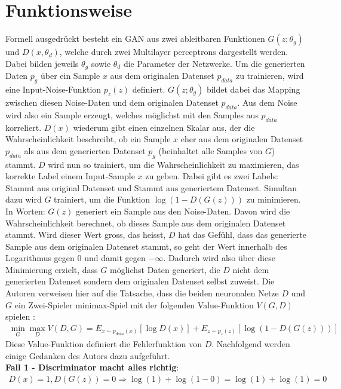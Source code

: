 \section{Funktionsweise}
Formell ausgedrückt besteht ein \Gls{GAN} aus zwei ableitbaren Funktionen $G(z;\theta_g)$ und $D(x,\theta_d)$, welche durch zwei \Glspl{Multilayer perceptron}
dargestellt werden. Dabei bilden jeweils $\theta_g$ sowie $\theta_d$ die Parameter der Netzwerke. Um die generierten Daten $p_g$ über ein Sample $x$ aus
dem originalen Datenset $p_{data}$ zu trainieren, wird eine Input-Noise-Funktion $p_z(z)$ definiert. $G(z;\theta_g)$ bildet dabei das
Mapping zwischen diesen Noise-Daten und dem originalen Datenset $p_{data}$.
Aus dem Noise wird also ein Sample erzeugt, welches möglichst mit den Samples aus $p_{data}$ korreliert.
$D(x)$ wiederum gibt einen einzelnen Skalar aus, der die Wahrscheinlichkeit beschreibt, ob ein Sample $x$ eher aus dem originalen Datenset $p_{data}$
als aus dem generierten Datenset $p_g$ (beinhaltet alle Samples von $G$) stammt.
$D$ wird nun so trainiert, um die Wahrscheinlichkeit zu maximieren, das korrekte Label einem Input-Sample $x$ zu geben. Dabei gibt es zwei Labels:
\glqq Stammt aus original Datenset\grqq{} und \glqq Stammt aus generiertem Datenset\grqq{}. Simultan dazu wird $G$ trainiert, um die Funktion
$\log(1 - D(G(z)))$ zu minimieren\cite[p.~1]{8253599}. In Worten: $G(z)$ generiert ein Sample aus den Noise-Daten.
Davon wird die Wahrscheinlichkeit berechnet, ob dieses Sample aus dem originalen Datenset stammt. Wird dieser Wert gross, das heisst,
$D$ hat das Gefühl, dass das generierte Sample aus dem originalen Datenset stammt, so geht der Wert innerhalb des Logarithmus gegen 0 und damit gegen $-\infty$.
Dadurch wird also über diese Minimierung erzielt, dass $G$ möglichst Daten generiert, die $D$ nicht dem generierten Datenset sondern dem originalen Datenset selbst zuweist.
Die Autoren verweisen hier auf die Tatsache, dass die beiden neuronalen Netze $D$ und $G$ ein
Zwei-Spieler minimax-Spiel mit der folgenden Value-Funktion $V(G,D)$ spielen \cite[p.~2]{8253599}:
\begin{align}
    \min_{G} \max_{D} V(D, G) = E_{x\sim p_{data}(x)}[\log D(x)] + E_{z\sim p_z(z)}[\log(1 - D(G(z)))]
\end{align}
Diese Value-Funktion definiert die Fehlerfunktion von $D$. Nachfolgend werden einige Gedanken des Autors dazu aufgeführt.\\
\textbf{Fall 1 - Discriminator macht alles richtig}:
\begin{align}
    D(x) = 1, D(G(z)) = 0 \Rightarrow \log(1) + \log(1 - 0) = \log(1) + \log(1) = 0
\end{align}

